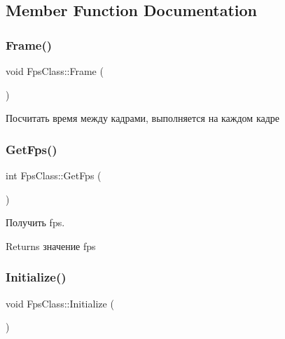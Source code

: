 \subsection{Member Function Documentation}
\mbox{\label{class_fps_class_aea9716ad6375377f04d75ae412953129}} 
\subsubsection{\texorpdfstring{Frame()}{Frame()}}
{\footnotesize\ttfamily void Fps\+Class\+::\+Frame (\begin{DoxyParamCaption}{ }\end{DoxyParamCaption})}



Посчитать время между кадрами, выполняется на каждом кадре 

\mbox{\label{class_fps_class_a664b6d19e6b5270db79597d32acb3a03}} 
\subsubsection{\texorpdfstring{Get\+Fps()}{GetFps()}}
{\footnotesize\ttfamily int Fps\+Class\+::\+Get\+Fps (\begin{DoxyParamCaption}{ }\end{DoxyParamCaption})}



Получить fps. 

\begin{DoxyReturn}{Returns}
значение fps 
\end{DoxyReturn}
\mbox{\label{class_fps_class_a75f15b746a2a62cd7afc5d54a7f9d8f9}} 
\subsubsection{\texorpdfstring{Initialize()}{Initialize()}}
{\footnotesize\ttfamily void Fps\+Class\+::\+Initialize (\begin{DoxyParamCaption}{ }\end{DoxyParamCaption})}



